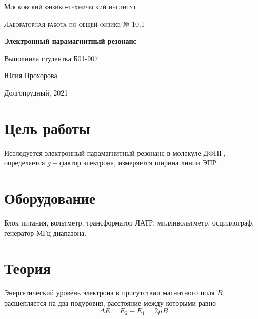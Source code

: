 \documentclass[a4paper]{article}
\begin{document}
\newcommand{\apple}{\char"F8FF}



\begin{titlepage}
    \vspace*{4cm}
	\centering
    {\scshape\LARGE Московский физико-технический институт\par}
	\vspace{1cm}
	{\scshape\Large Лабораторная работа по общей физике № 10.1\par}
	\vspace{1cm}
    {\huge\bfseries  Электронный парамагнитный резонанс \par}
	\vspace{2cm}
	\vfill
\begin{flushright}
	{\large Выполнила студентка Б01-907}\par
	\vspace{0.3cm}
	{\LARGE Юлия Прохорова}
\end{flushright}
	
	\vfill
Долгопрудный, 2021
\end{titlepage}

\pagestyle{fancy} 
\fancyhead[C]{}
\fancyfoot[C]{ \noindent\rule{\textwidth}{0.4pt} \thepage }

\tableofcontents

\newpage


\section{Цель работы}

Исследуется электронный парамагнитный резонанс в молекуле ДФПГ, определяется $g-$фактор электрона, измеряется ширина линии ЭПР.
\section{Оборудование}
Блок питания, вольтметр, трансформатор ЛАТР, милливольтметр, осциллограф, генератор МГц диапазона.

\section{Теория}

Энергетический уровень электрона в присутствии магнитного поля $B$ расщепляется на два подуровня, расстояние между которыми равно 
\begin{equation}
    \varDelta E = E_2 - E_1 = 2\mu B \label{eq1}
\end{equation}
\end{document}
